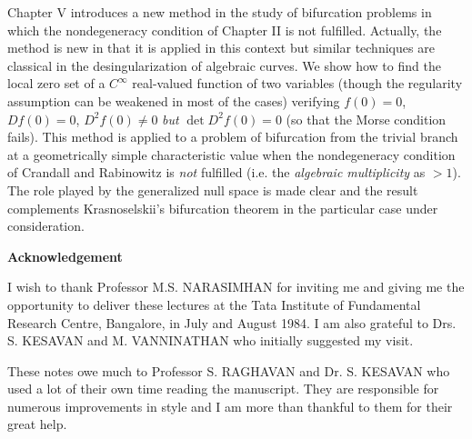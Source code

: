 Chapter V introduces a new method in the study of bifurcation problems in which the nondegeneracy condition of Chapter II is not fulfilled. Actually, the method is new in that it is applied in this context but similar techniques are classical in the desingularization of algebraic curves. We show how to find the local zero set of a $C^\infty$ real-valued function of two variables (though the regularity assumption can be weakened in most of the cases) verifying $f(0)=0$, $Df (0) = 0$, $D^2 f(0) \neq 0$ {\em but} $\det D^2 f(0)=0$ (so that the Morse condition fails). This method is applied to a problem of bifurcation from the trivial branch at a geometrically simple characteristic value when the nondegeneracy condition of Crandall and Rabinowitz is {\em not} fulfilled (i.e. the {\em algebraic multiplicity} as $> 1$). The role played by the generalized null space is made clear and the result complements Krasnoselskii's bifurcation theorem in the particular case under consideration. 

\newpage

\begin{center}
\textbf{Acknowledgement}
\end{center}


I wish to thank Professor M.S. NARASIMHAN for inviting me and giving me the opportunity to deliver these lectures at the Tata Institute of Fundamental Research Centre, Bangalore, in July and August 1984. I am also grateful to Drs. S. KESAVAN and M. VANNINATHAN who initially suggested my visit.

These notes owe much to Professor S. RAGHAVAN and Dr. S. KESAVAN who used a lot of their own time reading the manuscript. They are responsible for numerous improvements in style and I am more than thankful to them for their great help.
